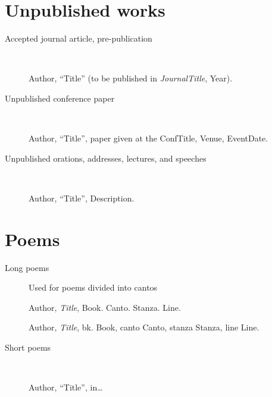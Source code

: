 \documentclass[extrafontsizes,11pt,a4paper,oneside]{memoir}
\newcommand*{\lit}[1]{\textsf{#1}}
\begin{document}

\chapter{Unpublished works}\label{sec:unpublished}

\begin{description}
  \item[Accepted journal article, pre-publication]~\par
  Author, \enquote{Title} (\lit{to be published in} \emph{JournalTitle}, Year).
  
  \item[Unpublished conference paper]~\par
  Author, \enquote{Title}, \lit{paper given at the} ConfTitle, Venue, EventDate.
  \\
  
  \item[Unpublished orations, addresses, lectures, and speeches]~\par Author, \enquote{Title}, Description.
\end{description}


\chapter{Poems}\label{sec:poem}

\begin{description}
  \item[Long poems] Used for poems divided into cantos
  \par Author, \emph{Title}, Book. Canto. Stanza. Line.
  \par Author, \emph{Title}, \lit{bk.} Book, \lit{canto} Canto, \lit{stanza} Stanza, \lit{line} Line.
  
  \item[Short poems]~\par
  \par Author, \enquote{Title}, in\dots
\end{description}
\end{document}
